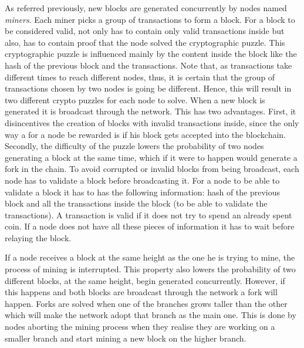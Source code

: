 \documentclass{dads}   %
\begin{document}
As referred previously, new blocks are generated concurrently by nodes named \textsl{miners}. Each miner picks a group of transactions to form a block. For a block to be considered valid, not only has to contain only valid transactions inside but also, has to contain proof that the node solved the cryptographic puzzle. This cryptographic puzzle is influenced mainly by the content inside the block like the hash of the previous block and the transactions. Note that, as transactions take different times to reach different nodes, thus, it is certain that the group of transactions chosen by two nodes is going be different. Hence, this will result in two different crypto puzzles for each node to solve. When a new block is generated it is broadcast through the network. This has two advantages. First, it disincentives the creation of blocks with invalid transactions inside, since the only way a for a node be rewarded is if his block gets accepted into the blockchain. Secondly, the difficulty of the puzzle lowers the probability of two nodes generating a block at the same time, which if it were to happen would generate a fork in the chain.  To avoid corrupted or invalid blocks from being broadcast, each node has to validate a block before broadcasting it. For a node to be able to validate a block it has to has the following information: hash of the previous block and all the transactions inside the block (to be able to validate the transactions). A transaction is valid if it does not try to spend an already spent coin. If a node does not have all these pieces of information it has to wait before relaying the block.

If a node receives a block at the same height as the one he is trying to mine, the process of mining is interrupted. This property also lowers the probability of two different blocks, at the same height, begin generated concurrently. However, if this happens and both blocks are broadcast through the network a fork will happen. Forks are solved when one of the branches grows taller than the other which will make the network adopt that branch as the main one. This is done by nodes aborting the mining process when they realise they are working on a smaller branch and start mining a new block on the higher branch.
\end{document}
